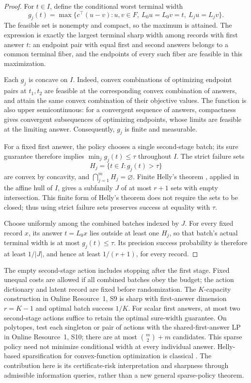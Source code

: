 \documentclass[12pt]{article}
\begin{document}
\begin{proof}
For $t\in I$, define the conditional worst terminal width
\[
 g_j(t)=\max\{c^\top(u-v):u,v\in F,\ L_0u=L_0v=t,
                                      \ L_ju=L_jv\}.
\]
The feasible set is nonempty and compact, so the maximum is attained.
The expression is exactly the largest terminal sharp width among records
with first answer $t$: an endpoint pair with equal first and second
answers belongs to a common terminal fiber, and the endpoints of every
such fiber are feasible in this maximization.

Each $g_j$ is concave on $I$. Indeed, convex combinations of optimizing
endpoint pairs at $t_1,t_2$ are feasible at the corresponding convex
combination of answers, and attain the same convex combination of their
objective values. The function is also upper semicontinuous: for a
convergent sequence of answers, compactness gives convergent subsequences
of optimizing endpoints, whose limits are feasible at the limiting
answer. Consequently, $g_j$ is finite and measurable.

For a fixed first answer, the policy chooses a single second-stage batch;
its sure guarantee therefore implies $\min_jg_j(t)\leq\tau$ throughout
$I$. The strict failure sets
\[
 H_j=\{t\in I:g_j(t)>\tau\}
\]
are convex by concavity, and $\bigcap_{j=1}^m H_j=\varnothing$.
Finite Helly's theorem \citep[Theorem~1.1]{amenta2016}, applied in the affine hull of $I$, gives a
subfamily $J$ of at most $r+1$ sets with empty intersection. This finite
form of Helly's theorem does not require the sets to be closed; thus
using strict failure sets preserves success at equality with $\tau$.

Choose uniformly among the combined batches indexed by $J$. For every
fixed record $x$, its answer $t=L_0x$ lies outside at least one $H_j$,
so that batch's actual terminal width is at most $g_j(t)\leq\tau$.
Its precision success probability is therefore at least $1/|J|$, and
hence at least $1/(r+1)$, for every record.
\end{proof}


The empty second-stage action includes stopping after the first stage.
Fixed unequal costs are allowed if all combined batches obey the budget;
the action dictionary and latent record are fixed before randomization.
The $K$-capacity construction in Online Resource~1, S9 is sharp
with first-answer dimension $r=K-1$ and optimal batch success $1/K$.
For scalar first answers, at most two second-stage actions suffice to
retain the optimal sure-width guarantee. On polytopes, test each singleton
or pair of actions with the shared-first-answer LP in
Online Resource~1, S10; there are at most
$\binom m2+m$ candidates. This sparse policy need not minimize conditional
width at every individual answer. Helly-based sparsification for
convex-function optimization is classical
\citep[Section~2, Theorem~1]{rockafellar1965}. The contribution here is
its certificate-risk interpretation and sharpness through admissible
information queries, rather than a new general sparse-policy theorem.
\end{document}
